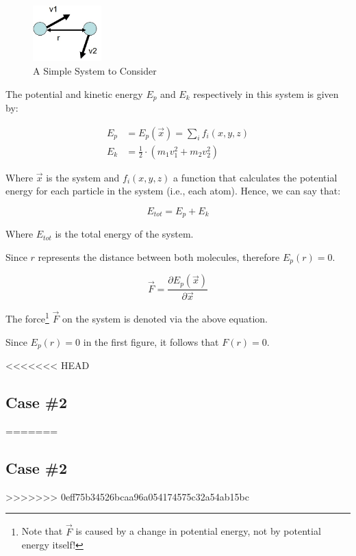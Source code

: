 \documentclass[
  letterpaper,
  DIV=11,
  numbers=noendperiod]{scrreprt}
\begin{document}
\begin{figure}

{\centering \includegraphics[width=1.04in,height=\textheight]{./images/wk1/system.jpg}

}

\caption{A Simple System to Consider}

\end{figure}

The potential and kinetic energy \(E_p\) and \(E_k\) respectively in
this system is given by:

\begin{align}
  E_p &= E_p(\vec{x}) = \sum_{i}f_i(x, y, z) \\ 
  E_k &= \frac{1}{2} \cdot (m_1v_1^2 + m_2v_2^2) 
\end{align}

Where \(\vec{x}\) is the system and \(f_i(x, y, z)\) a function that
calculates the potential energy for each particle in the system (i.e.,
each atom). Hence, we can say that:

\begin{equation}
  E_{tot} = E_p + E_k
\end{equation}

Where \(E_{tot}\) is the total energy of the system.

Since \(r\) represents the distance between both molecules, therefore
\(E_p(r) = 0\).

\begin{equation}
  \vec{F} = \frac{\partial E_p(\vec{x})}{\partial \vec{x}}
\end{equation}

The force\footnote{Note that \(\vec{F}\) is caused by a change in
  potential energy, not by potential energy itself!} \(\vec{F}\) on the
system is denoted via the above equation.

Since \(E_p(r) = 0\) in the first figure, it follows that \(F(r) = 0\).

<<<<<<< HEAD
\hypertarget{case-2-1}{%
\subsection{Case \#2}\label{case-2-1}}
=======
\hypertarget{case-2}{%
\subsection{Case \#2}\label{case-2}}
>>>>>>> 0eff75b34526bcaa96a054174575c32a54ab15bc
\end{document}
